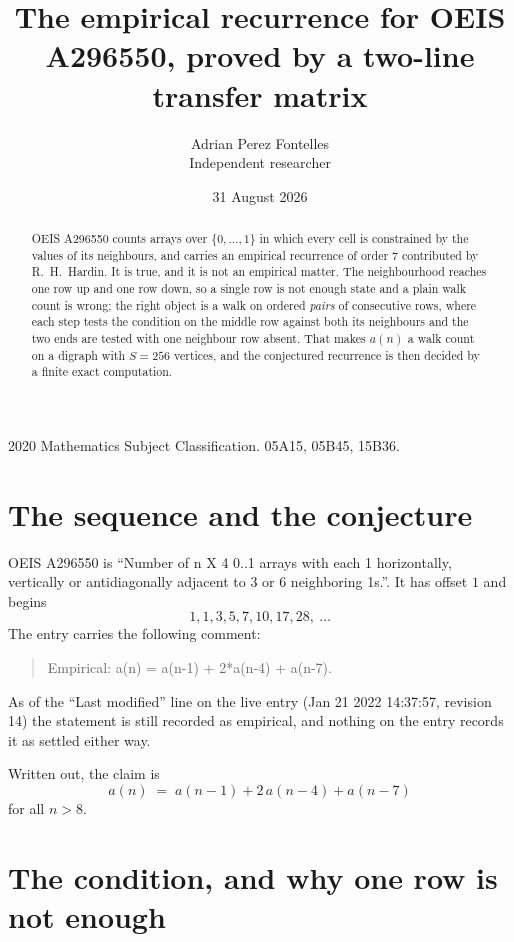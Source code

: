 \documentclass[11pt,a4paper]{article}
\title{The empirical recurrence for OEIS A296550, proved by a two-line transfer matrix}
\author{Adrian Perez Fontelles\\ \small Independent researcher}
\date{31 August 2026}
\theoremstyle{plain}
\theoremstyle{definition}
\begin{document}
\maketitle

\begin{abstract}
OEIS A296550 counts arrays over $\{0,\dots,1\}$ in which every cell is constrained by the
values of its neighbours, and carries an empirical recurrence of order $7$ contributed
by R.~H.~Hardin. It is true, and it is not an empirical matter. The neighbourhood reaches one
row up and one row down, so a single row is not enough state and a plain walk count
is wrong; the right object is a walk on ordered \emph{pairs} of consecutive rows, where
each step tests the condition on the middle row against both its neighbours and the two
ends are tested with one neighbour row absent. That makes $a(n)$ a walk count on a digraph
with $S=256$ vertices, and the conjectured recurrence is then decided by a finite exact
computation.
\end{abstract}

\noindent\small 2020 Mathematics Subject Classification. 05A15, 05B45, 15B36.\normalsize

\section{The sequence and the conjecture}

OEIS A296550 is ``Number of n X 4 0..1 arrays with each 1 horizontally, vertically or antidiagonally adjacent to 3 or 6 neighboring 1s.''. It has offset $1$ and begins
\[
1, 1, 3, 5, 7, 10, 17, 28,\ \dots
\]
The entry carries the following comment:
\begin{quote}\small
Empirical: a(n) = a(n-1) + 2*a(n-4) + a(n-7).
\end{quote}
As of the ``Last modified'' line on the live entry (Jan 21 2022 14:37:57, revision 14) the statement is
still recorded as empirical, and nothing on the entry records it as settled either way.

Written out, the claim is
\begin{equation}\label{eq:conj}
a(n)\;=\;a(n-1) + 2\,a(n-4) + a(n-7)
\end{equation}
for all $n>8$.

\section{The condition, and why one row is not enough}
\end{document}
